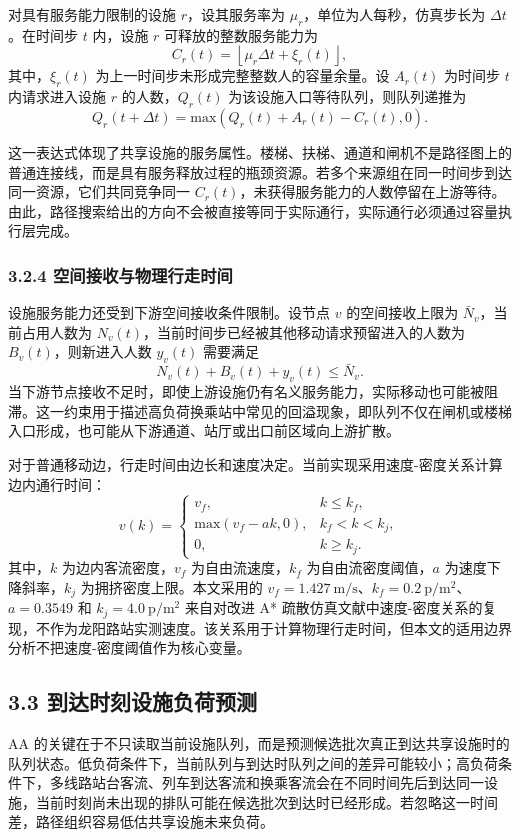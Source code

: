 \documentclass[UTF8,a4paper,12pt]{ctexart}
\begin{document}
对具有服务能力限制的设施 \(r\)，设其服务率为 \(\mu_r\)，单位为人每秒，仿真步长为 \(\Delta t\)。在时间步 \(t\) 内，设施 \(r\) 可释放的整数服务能力为
\[
C_r(t)=\left\lfloor \mu_r\Delta t+\xi_r(t)\right\rfloor ,
\]
其中，\(\xi_r(t)\) 为上一时间步未形成完整整数人的容量余量。设 \(A_r(t)\) 为时间步 \(t\) 内请求进入设施 \(r\) 的人数，\(Q_r(t)\) 为该设施入口等待队列，则队列递推为
\[
Q_r(t+\Delta t)=\mathrm{max}\left(Q_r(t)+A_r(t)-C_r(t),0\right).
\]

这一表达式体现了共享设施的服务属性。楼梯、扶梯、通道和闸机不是路径图上的普通连接线，而是具有服务释放过程的瓶颈资源。若多个来源组在同一时间步到达同一资源，它们共同竞争同一 \(C_r(t)\)，未获得服务能力的人数停留在上游等待。由此，路径搜索给出的方向不会被直接等同于实际通行，实际通行必须通过容量执行层完成。

\subsubsection{3.2.4 空间接收与物理行走时间}

设施服务能力还受到下游空间接收条件限制。设节点 \(v\) 的空间接收上限为 \(\bar N_v\)，当前占用人数为 \(N_v(t)\)，当前时间步已经被其他移动请求预留进入的人数为 \(B_v(t)\)，则新进入人数 \(y_v(t)\) 需要满足
\[
N_v(t)+B_v(t)+y_v(t)\leq \bar N_v .
\]
当下游节点接收不足时，即使上游设施仍有名义服务能力，实际移动也可能被阻滞。这一约束用于描述高负荷换乘站中常见的回溢现象，即队列不仅在闸机或楼梯入口形成，也可能从下游通道、站厅或出口前区域向上游扩散。

对于普通移动边，行走时间由边长和速度决定。当前实现采用速度-密度关系计算边内通行时间：
\[
v(k)=
\begin{cases}
v_f, & k\leq k_f,\\
\mathrm{max}(v_f-ak,0), & k_f<k<k_j,\\
0, & k\geq k_j .
\end{cases}
\]
其中，\(k\) 为边内客流密度，\(v_f\) 为自由流速度，\(k_f\) 为自由流密度阈值，\(a\) 为速度下降斜率，\(k_j\) 为拥挤密度上限。本文采用的 \(v_f=1.427\ \mathrm{m/s}\)、\(k_f=0.2\ \mathrm{p/m^2}\)、\(a=0.3549\) 和 \(k_j=4.0\ \mathrm{p/m^2}\) 来自对改进 A* 疏散仿真文献中速度-密度关系的复现，不作为龙阳路站实测速度。该关系用于计算物理行走时间，但本文的适用边界分析不把速度-密度阈值作为核心变量。

\subsection{3.3 到达时刻设施负荷预测}

AA 的关键在于不只读取当前设施队列，而是预测候选批次真正到达共享设施时的队列状态。低负荷条件下，当前队列与到达时队列之间的差异可能较小；高负荷条件下，多线路站台客流、列车到达客流和换乘客流会在不同时间先后到达同一设施，当前时刻尚未出现的排队可能在候选批次到达时已经形成。若忽略这一时间差，路径组织容易低估共享设施未来负荷。
\end{document}
